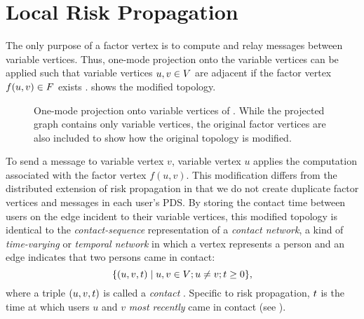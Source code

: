 \section{Local Risk Propagation}\label{sec:vertices-to-actors}

The only purpose of a factor vertex is to compute and relay messages between
variable vertices. Thus, one-mode projection onto the variable vertices can
be applied such that variable vertices $u, v \in V$ are adjacent if
the factor vertex $f(u, v) \in F$ exists \cite{Zhou2007}.
 shows the modified topology.
%
\begin{figure}[htbp]
\centering
{}
\caption[One-mode projection of a factor graph]{One-mode projection
onto variable vertices of . While the projected graph
contains only variable vertices, the original factor vertices are also included
to show how the original topology is modified.}
\label{fig:projected}
\end{figure}
%
To send a message to variable vertex $v$, variable vertex $u$ applies the
computation associated with the factor vertex $f(u, v)$. This modification
differs from the distributed extension of risk propagation \cite{Ayday2021} in
that we do not create duplicate factor vertices and messages in each user's
PDS. By storing the contact time between users on the edge incident to their
variable vertices, this modified topology is identical to the
\emph{contact-sequence} representation of a \emph{contact network}, a kind of
\emph{time-varying} or \emph{temporal network} in which a vertex represents
a person and an edge indicates that two persons came in contact:
%
\begin{equation}
    \{(u, v, t) \mid u, v \in V; u \neq v; t \geq 0\}, \label{eq:contact-seq}
\end{equation}
%
where a triple $(u, v, t)$ is called a \emph{contact} \cite{Holme2012}.
Specific to risk propagation, $t$ is the time at which users $u$ and $v$
\emph{most recently} came in contact (see ).

